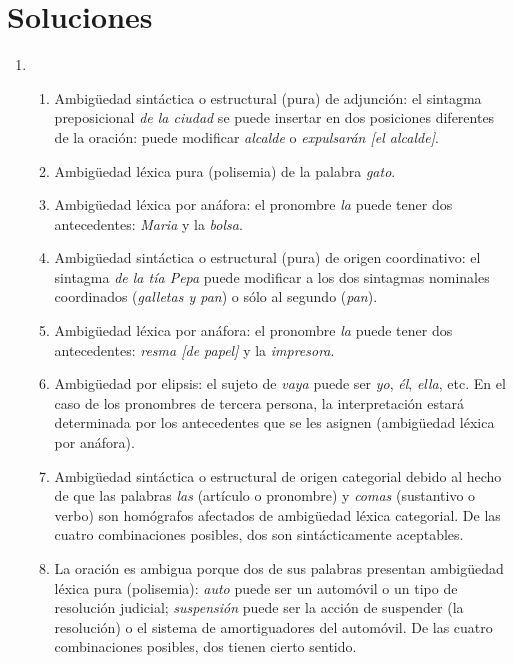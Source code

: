 \section{Soluciones} 

\begin{enumerate} \item \begin{enumerate} \item Ambigüedad sintáctica o estructural (pura) de adjunción: el sintagma preposicional \emph{de la ciudad} se puede insertar en dos posiciones diferentes de la oración: puede modificar \emph{alcalde} o \emph{expulsarán [el alcalde]}. \item Ambigüedad léxica pura (polisemia) de la palabra \emph{gato}. \item Ambigüedad léxica por anáfora: el pronombre \emph{la} puede tener dos antecedentes: \emph{Maria} y la \emph{bolsa}. \item Ambigüedad sintáctica o estructural (pura) de origen coordinativo: el sintagma \emph{de la tía Pepa} puede modificar a los dos sintagmas nominales coordinados (\emph{galletas y pan}) o sólo al segundo (\emph{pan}). \item Ambigüedad léxica por anáfora: el pronombre \emph{la} puede tener dos antecedentes: \emph{resma [de papel]} y la \emph{impresora}. \item Ambigüedad por elipsis: el sujeto de \emph{vaya} puede ser \emph{yo}, \emph{él}, \emph{ella}, etc. En el caso de los pronombres de tercera persona, la interpretación estará determinada por los antecedentes que se les asignen (ambigüedad léxica por anáfora). \item Ambigüedad sintáctica o estructural de origen categorial debido al hecho de que las palabras \emph{las} (artículo o pronombre) y \emph{comas} (sustantivo o verbo) son homógrafos afectados de ambigüedad léxica categorial. De las cuatro combinaciones posibles, dos son sintácticamente aceptables. \item La oración es ambigua porque dos de sus palabras presentan ambigüedad léxica pura (polisemia): \emph{auto} puede ser un automóvil o un tipo de resolución judicial; \emph{suspensión} puede ser la acción de suspender (la resolución) o el sistema de amortiguadores del automóvil. De las cuatro combinaciones posibles, dos tienen cierto sentido. 


\end{enumerate}
\end{enumerate}

